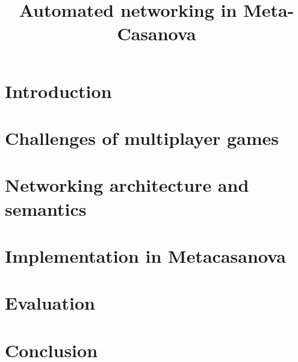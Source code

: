 \documentclass{article}
\title{Automated networking in Meta-Casanova}
\author{ }
\date { }
\begin{document}
\maketitle
	
\section{Introduction}


\section{Challenges of multiplayer games}


\section{Networking architecture and semantics}


\section{Implementation in Metacasanova}


\section{Evaluation}


\section{Conclusion}




\end{document}
